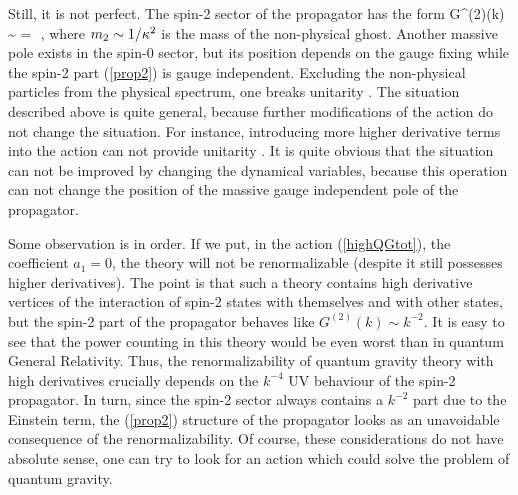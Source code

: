 Still, it is not perfect. The spin-2 sector of the propagator 
has the form
\beq
G^{(2)}(k) \sim {}
= \,\,,
\label{prop2}
\eeq
where $m_2 \sim 1/\kappa^2$ is the mass of the non-physical ghost. 
Another massive pole exists in the spin-$0$ sector, but its
position depends on the gauge fixing while the spin-2 part 
(\ref{prop2}) is gauge independent. Excluding the non-physical 
particles from the physical spectrum, one breaks unitarity 
\cite{stelle}. The situation described above is quite general, 
because further modifications of the action do not change the 
situation. For instance, introducing more higher derivative 
terms into the action can not provide unitarity \cite{highderi}.
It is quite obvious that the situation can not be improved 
by changing the dynamical variables, because this operation 
can not change the position of the massive gauge independent 
pole of the propagator. 

Some observation is in order. If we put, in the action (\ref{highQGtot}),
the coefficient $a_1=0$, the theory will not be renormalizable 
(despite it still possesses higher derivatives). The point is that
such a theory contains high derivative vertices of the interaction 
of spin-2 states with themselves and with other states, but the
spin-2 part of the propagator behaves like $G^{(2)}(k) \sim k^{-2}$. 
It is easy to see that the power counting in this theory would 
be even worst than in quantum General Relativity. Thus, the 
renormalizability of quantum gravity theory with high derivatives
crucially depends on the $k^{-4}$ UV behaviour of the spin-2
propagator. In turn, since the spin-2 sector always contains 
a $k^{-2}$ part due to the Einstein term, the (\ref{prop2})
structure of the propagator looks as an unavoidable consequence 
of the renormalizability. Of course, these considerations do 
not have absolute sense, one can try to look for an action which 
could solve the problem of quantum gravity. 

